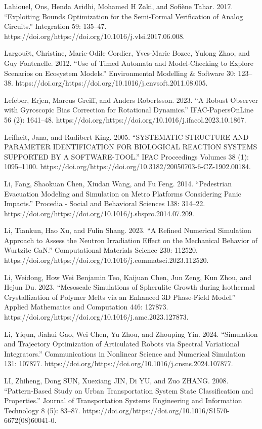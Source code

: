 \documentclass[utf8]{gradu3}
\begin{document}
Lahiouel, Ons, Henda Aridhi, Mohamed H Zaki, and Sofiène Tahar. 2017. “Exploiting Bounds Optimization for the Semi-Formal Verification of Analog Circuits.” Integration 59: 135–47. https://doi.org/https://doi.org/10.1016/j.vlsi.2017.06.008.

Largouët, Christine, Marie-Odile Cordier, Yves-Marie Bozec, Yulong Zhao, and Guy Fontenelle. 2012. “Use of Timed Automata and Model-Checking to Explore Scenarios on Ecosystem Models.” Environmental Modelling \& Software 30: 123–38. https://doi.org/https://doi.org/10.1016/j.envsoft.2011.08.005.

Lefeber, Erjen, Marcus Greiff, and Anders Robertsson. 2023. “A Robust Observer with Gyroscopic Bias Correction for Rotational Dynamics.” IFAC-PapersOnLine 56 (2): 1641–48. https://doi.org/https://doi.org/10.1016/j.ifacol.2023.10.1867.

Leifheit, Jana, and Rudibert King. 2005. “SYSTEMATIC STRUCTURE AND PARAMETER IDENTIFICATION FOR BIOLOGICAL REACTION SYSTEMS SUPPORTED BY A SOFTWARE-TOOL.” IFAC Proceedings Volumes 38 (1): 1095–1100. https://doi.org/https://doi.org/10.3182/20050703-6-CZ-1902.00184.

Li, Fang, Shaokuan Chen, Xiudan Wang, and Fu Feng. 2014. “Pedestrian Evacuation Modeling and Simulation on Metro Platforms Considering Panic Impacts.” Procedia - Social and Behavioral Sciences 138: 314–22. https://doi.org/https://doi.org/10.1016/j.sbspro.2014.07.209.

Li, Tiankun, Hao Xu, and Fulin Shang. 2023. “A Refined Numerical Simulation Approach to Assess the Neutron Irradiation Effect on the Mechanical Behavior of Wurtzite GaN.” Computational Materials Science 230: 112520. https://doi.org/https://doi.org/10.1016/j.commatsci.2023.112520.

Li, Weidong, How Wei Benjamin Teo, Kaijuan Chen, Jun Zeng, Kun Zhou, and Hejun Du. 2023. “Mesoscale Simulations of Spherulite Growth during Isothermal Crystallization of Polymer Melts via an Enhanced 3D Phase-Field Model.” Applied Mathematics and Computation 446: 127873. https://doi.org/https://doi.org/10.1016/j.amc.2023.127873.

Li, Yiqun, Jiahui Gao, Wei Chen, Yu Zhou, and Zhouping Yin. 2024. “Simulation and Trajectory Optimization of Articulated Robots via Spectral Variational Integrators.” Communications in Nonlinear Science and Numerical Simulation 131: 107877. https://doi.org/https://doi.org/10.1016/j.cnsns.2024.107877.

LI, Zhiheng, Dong SUN, Xuexiang JIN, Di YU, and Zuo ZHANG. 2008. “Pattern-Based Study on Urban Transportation System State Classification and Properties.” Journal of Transportation Systems Engineering and Information Technology 8 (5): 83–87. https://doi.org/https://doi.org/10.1016/S1570-6672(08)60041-0.
\end{document}
